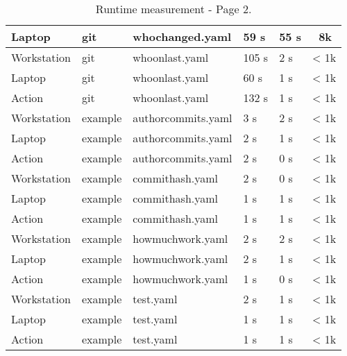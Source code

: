 \begin{table}[H]
\begin{tabular}{ | m{} | m{} | m{} | m{} | m{} | m{} | }
		\hline
		Laptop & git & whochanged.yaml & 59 s & 55 s & ~8k \\ 
		\hline
		Workstation & git & whoonlast.yaml & 105 s & 2 s & < 1k \\ 
		\hline
		Laptop & git & whoonlast.yaml & 60 s & 1 s & < 1k \\ 
		\hline
		Action & git & whoonlast.yaml & 132 s & 1 s & < 1k \\ 
		\hline
		Workstation & example & authorcommits.yaml & 3 s & 2 s & < 1k \\ 
		\hline
		Laptop & example & authorcommits.yaml & 2 s & 1 s & < 1k \\ 
		\hline
		Action & example & authorcommits.yaml & 2 s & 0 s & < 1k \\ 
		\hline
		Workstation & example & commithash.yaml & 2 s & 0 s & < 1k \\ 
		\hline
		Laptop & example & commithash.yaml & 1 s & 1 s & < 1k \\ 
		\hline
		Action & example & commithash.yaml & 1 s & 1 s & < 1k \\ 
		\hline
		Workstation & example & howmuchwork.yaml & 2 s & 2 s & < 1k \\ 
		\hline
		Laptop & example & howmuchwork.yaml & 2 s & 1 s & < 1k \\ 
		\hline
		Action & example & howmuchwork.yaml & 1 s & 0 s & < 1k \\ 
		\hline
		Workstation & example & test.yaml & 2 s & 1 s & < 1k \\ 
		\hline
		Laptop & example & test.yaml & 1 s & 1 s & < 1k \\ 
		\hline
		Action & example & test.yaml & 1 s & 1 s & < 1k \\ 
		\hline
	\end{tabular}
	\caption{Runtime measurement - Page 2.}
	\label{tab:mes-3}
\end{table}

